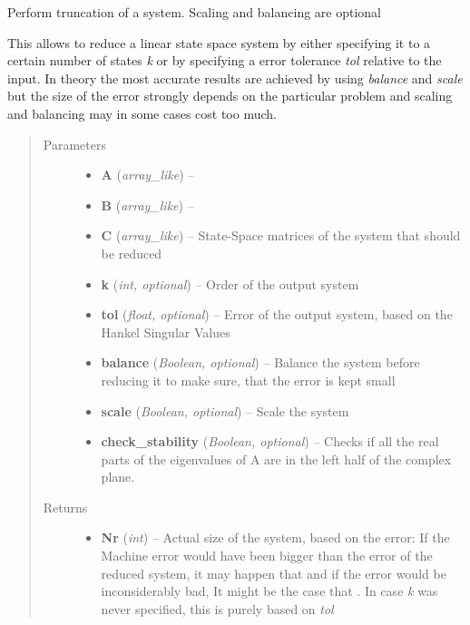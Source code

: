 \documentclass[letterpaper,10pt,english]{sphinxmanual}
\begin{document}
\begin{fulllineitems}
\label{pod:pod.truncation_square_root}
Perform truncation of a system. Scaling and balancing are optional

This allows to reduce a linear state space system by either specifying it
to a certain number of states \emph{k} or by specifying a error tolerance \emph{tol}
relative to the input. In theory the most accurate results are achieved by
using \emph{balance} and \emph{scale} but the size of the error strongly depends on
the particular problem and scaling and balancing may in some cases cost
too much.
\begin{quote}\begin{description}
\item[{Parameters}] \leavevmode\begin{itemize}
\item {} 
\textbf{A} (\emph{array\_like}) -- 

\item {} 
\textbf{B} (\emph{array\_like}) -- 

\item {} 
\textbf{C} (\emph{array\_like}) -- State-Space matrices of the system that should be reduced

\item {} 
\textbf{k} (\emph{int, optional}) -- Order of the output system

\item {} 
\textbf{tol} (\emph{float, optional}) -- Error of the output system, based on the Hankel Singular Values

\item {} 
\textbf{balance} (\emph{Boolean, optional}) -- Balance the system before reducing it to make sure, that the error
is kept small

\item {} 
\textbf{scale} (\emph{Boolean, optional}) -- Scale the system

\item {} 
\textbf{check\_stability} (\emph{Boolean, optional}) -- Checks if all the real parts of the eigenvalues of A are in the left
half of the complex plane.

\end{itemize}

\item[{Returns}] \leavevmode
\begin{itemize}
\item {} 
\textbf{Nr} (\emph{int}) --
Actual size of the system, based on the error: If the Machine error
would have been bigger than the error of the reduced system, it may
happen that  and if the error would be inconsiderably bad,
It might be the case that . In case \emph{k} was never specified,
this is purely based on \emph{tol}


\end{itemize}
\end{description}
\end{quote}
\end{fulllineitems}
\end{document}
